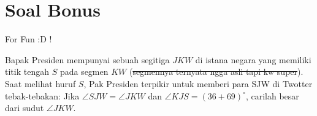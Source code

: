 \documentclass[11pt]{scrartcl}
\begin{document}
	
	\section{Soal Bonus}
	
	For Fun :D !
	\begin{soalbaru}
	Bapak Presiden mempunyai sebuah segitiga $JKW$ di istana negara yang memiliki titik tengah $S$ pada segmen $KW$ (\sout{segmennya ternyata ngga asli tapi kw super}). Saat melihat huruf $S$, Pak Presiden terpikir untuk memberi para SJW di Twotter tebak-tebakan: Jika $\angle SJW = \angle JKW$ dan $\angle KJS = (36+69)^\circ$, carilah besar dari sudut $\angle JKW$.
	\end{soalbaru}
\end{document}
